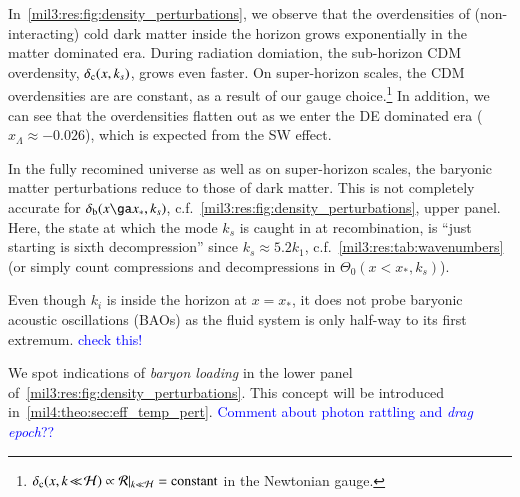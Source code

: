 In~\cref{mil3:res:fig:density_perturbations}, we observe that the overdensities of (non-interacting) cold dark matter inside the horizon grows exponentially in the matter dominated era. During radiation domiation, the sub-horizon CDM overdensity, $\delta_\mathrm{c}(x, k_s)$, grows even faster. On super-horizon scales, the CDM overdensities are are constant, as a result of our gauge choice.\footnote{$\delta_\mathrm{c}(x, k\!\ll\! \mathcal{H}) \propto \mathcal{R}|_{k\ll \mathcal{H}} = \text{constant}$ in the Newtonian gauge.} In addition, we can see that the overdensities flatten out as we enter the DE dominated era ($x_\Lambda\approx -0.026$), which is expected from the SW effect.

In the fully recomined universe as well as on super-horizon scales, the baryonic matter perturbations reduce to those of dark matter. This is not completely accurate for $\delta\ped{b}(x\ga x_*,k_s)$, c.f.~\cref{mil3:res:fig:density_perturbations}, upper panel. Here, the state at which the mode $k_s$ is caught in at recombination, is ``just starting is sixth decompression'' since $k_s\approx 5.2 k_1$, c.f.~\cref{mil3:res:tab:wavenumbers} (or simply count compressions and decompressions in $\Theta_0(x\!<\!x_*, k_s)$). 

Even though $k_i$ is inside the horizon at $x=x_*$, it does not probe baryonic acoustic oscillations (BAOs) as the fluid system is only half-way to its first extremum. \textcolor{blue}{check this!}

We spot indications of \textit{baryon loading} in the lower panel of~\cref{mil3:res:fig:density_perturbations}. This concept will be introduced in~\cref{mil4:theo:sec:eff_temp_pert}. \textcolor{blue}{Comment about photon rattling and \textit{drag epoch}??}







